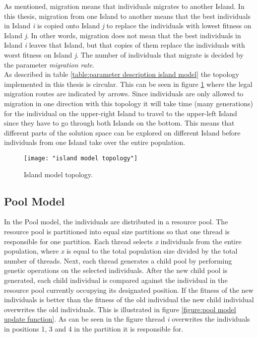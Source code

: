 \noindent As mentioned, migration means that individuals migrates to another Island. In this thesis, migration from one Island to another means that the best individuals in Island \textit{i} is copied onto Island \textit{j} to replace the individuals with lowest fitness on Island \textit{j}. In other words, migration does not mean that the best individuals in Island \textit{i} leaves that Island, but that copies of them replace the individuals with worst fitness on Island \textit{j}. The number of individuals that migrate is decided by the parameter \textit{migration rate}.\\


\noindent As described in table \ref{table:parameter description island model} the topology implemented in this thesis is circular. This can be seen in figure \ref{figure:topology island model} where the legal migration routes are indicated by arrows. Since individuals are only allowed to migration in one direction with this topology it will take time (many generations) for the individual on the upper-right Island to travel to the upper-left Island since they have to go through both Islands on the bottom. This means that different parts of the solution space can be explored on different Island before individuals from one Island take over the entire population.


\begin{figure}
    \begin{center}
        \texttt{[image: "island model topology"]}
        \caption{Island model topology.}
        \label{figure:topology island model}
    \end{center}
\end{figure}


\subsection{Pool Model}


\noindent In the Pool model, the individuals are distributed in a resource pool. The resource pool is partitioned into equal size partitions so that one thread is responsible for one partition. Each thread selects \textit{x} individuals from the entire population, where \textit{x} is equal to the total population size divided by the total number of threads. Next, each thread generates a child pool by performing genetic operations on the selected individuals. After the new child pool is generated, each child individual is compared against the individual in the resource pool currently occupying its designated position. If the fitness of the new individuals is better than the fitness of the old individual the new child individual overwrites the old individuals. This is illustrated in figure \ref{figure:pool model update function}. As can be seen in the figure thread \textit{i} overwrites the individuals in positions 1, 3 and 4 in the partition it is responsible for.\\


